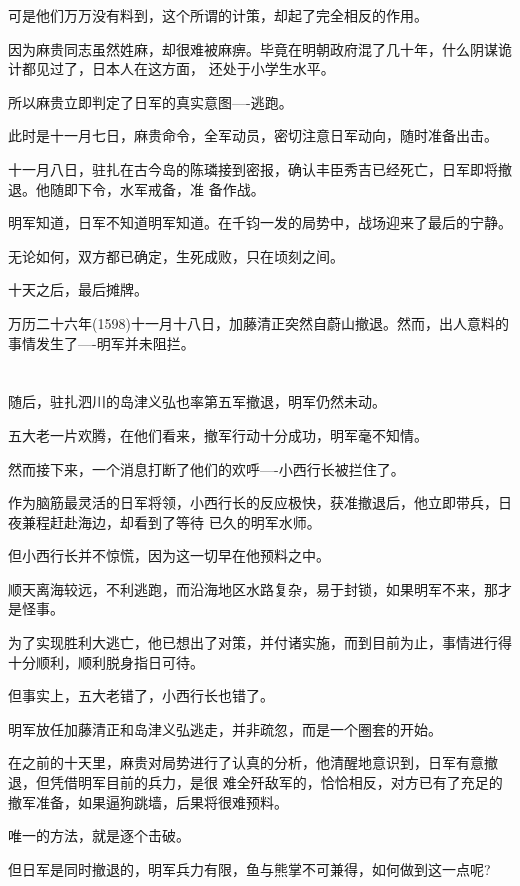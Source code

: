\documentclass[11pt,a4paper,onecolumn]{article}
\begin{document}
可是他们万万没有料到，这个所谓的计策，却起了完全相反的作用。

因为麻贵同志虽然姓麻，却很难被麻痹。毕竟在明朝政府混了几十年，什么阴谋诡计都见过了，日本人在这方面，
还处于小学生水平。

所以麻贵立即判定了日军的真实意图----逃跑。

此时是十一月七日，麻贵命令，全军动员，密切注意日军动向，随时准备出击。

十一月八日，驻扎在古今岛的陈璘接到密报，确认丰臣秀吉已经死亡，日军即将撤退。他随即下令，水军戒备，准
备作战。

明军知道，日军不知道明军知道。在千钧一发的局势中，战场迎来了最后的宁静。

无论如何，双方都已确定，生死成败，只在顷刻之间。

十天之后，最后摊牌。

万历二十六年(1598)十一月十八日，加藤清正突然自蔚山撤退。然而，出人意料的事情发生了----明军并未阻拦。

\section[\thesection]{}

随后，驻扎泗川的岛津义弘也率第五军撤退，明军仍然未动。

五大老一片欢腾，在他们看来，撤军行动十分成功，明军毫不知情。

然而接下来，一个消息打断了他们的欢呼----小西行长被拦住了。

作为脑筋最灵活的日军将领，小西行长的反应极快，获准撤退后，他立即带兵，日夜兼程赶赴海边，却看到了等待
已久的明军水师。

但小西行长并不惊慌，因为这一切早在他预料之中。

顺天离海较远，不利逃跑，而沿海地区水路复杂，易于封锁，如果明军不来，那才是怪事。

为了实现胜利大逃亡，他已想出了对策，并付诸实施，而到目前为止，事情进行得十分顺利，顺利脱身指日可待。

但事实上，五大老错了，小西行长也错了。

明军放任加藤清正和岛津义弘逃走，并非疏忽，而是一个圈套的开始。

在之前的十天里，麻贵对局势进行了认真的分析，他清醒地意识到，日军有意撤退，但凭借明军目前的兵力，是很
难全歼敌军的，恰恰相反，对方已有了充足的撤军准备，如果逼狗跳墙，后果将很难预料。

唯一的方法，就是逐个击破。

但日军是同时撤退的，明军兵力有限，鱼与熊掌不可兼得，如何做到这一点呢?
\end{document}
